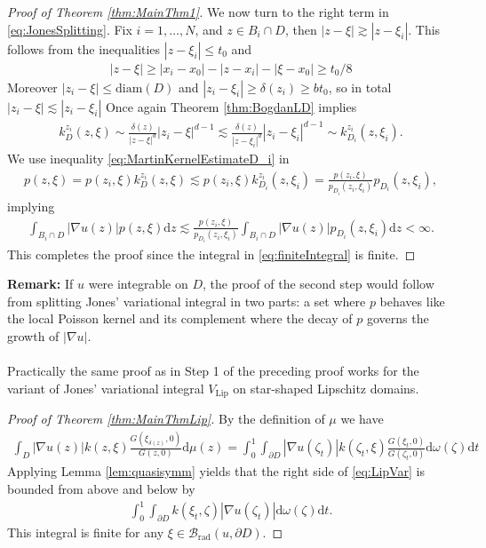 \documentclass[a4paper,12pt]{article}
\theoremstyle{definition}
\theoremstyle{definition}
\begin{document}
\begin{proof}[Proof of Theorem \ref{thm:MainThm1}]
		We now turn to the right term in \eqref{eq:JonesSplitting}. Fix $i=1,\dots,N$, and $z\in B_i\cap D$, then $|z-\xi|\gtrsim|z-\xi_i|$. This follows from the inequalities $|z-\xi_i|\leq t_0$ and 
		\begin{align}
			|z-\xi|\geq|x_i-x_0|-|z-x_i|-|\xi-x_0|\geq t_0/8
		\end{align}
		Moreover $|z_i-\xi|\leq\mathrm{diam}(D)$ and $|z_i-\xi_i|\geq\delta(z_i)\geq b t_0$, so in total $|z_i-\xi|\lesssim|z_i-\xi_i|$ Once again Theorem \ref{thm:BogdanLD} implies
		\begin{align}\label{eq:MartinKernelEstimateD_i}
			k_{D}^{z_i}(z,\xi)\sim\frac{\delta(z)}{|z-\xi|^d}|z_i-\xi|^{d-1}\lesssim \frac{\delta(z)}{|z-\xi_i|^d}|z_i-\xi_i|^{d-1}\sim k_{D_i}^{z_i}(z,\xi_i).
		\end{align}
		We use inequality \eqref{eq:MartinKernelEstimateD_i} in
		\begin{align*}
			p(z,\xi)=p(z_i,\xi) k^{z_i}_{D}(z,\xi)\lesssim p(z_i,\xi)k^{z_i}_{ D_i}(z,\xi_i) = \frac{p(z_i,\xi)}{p_{D_i}(z_i,\xi_i)} p_{D_i}(z,\xi_i),
		\end{align*}
		implying 
		\begin{align}
			\int_{B_i\cap D}|\nabla u(z)|p(z,\xi)\mathrm dz\lesssim \frac{p(z_i,\xi)}{p_{D_i}(z_i,\xi_i)}\int_{B_i\cap D}|\nabla u(z)|p_{D_i}(z,\xi_i)\mathrm dz<\infty.
		\end{align}
		This completes the proof since the integral in \eqref{eq:finiteIntegral} is finite.
	\end{proof}
	\noindent\textbf{Remark:} If $u$ were integrable on $D$, the proof of the second step would follow from splitting Jones' variational integral in two parts: a set where $p$ behaves like the local Poisson kernel and its complement where the decay of $p$ governs the growth of $|\nabla u|$.\\\\
	Practically the same proof as in Step 1 of the preceding proof works for the variant of Jones' variational integral $V_{\mathrm{Lip}}$ on star-shaped Lipschitz domains.
	\begin{proof}[Proof of Theorem \ref{thm:MainThmLip}]
		By the definition of $\mu$ we have
		\begin{align}\label{eq:LipVar}
			\int_D|\nabla u(z)|k(z,\xi)\frac{G(\xi_{\delta(z)},0)}{G(z,0)}\mathrm d\mu(z) =\int_0^1\int_{\partial D}|\nabla u(\zeta_t)|k(\zeta_t,\xi)\frac{G(\xi_t,0)}{G(\zeta_t,0)}\mathrm{d}\omega(\zeta)\mathrm{d}t
		\end{align}
		Applying Lemma \ref{lem:quasisymm} yields that the right side of \eqref{eq:LipVar} is bounded from above and below by
		\begin{align*}
			\int_0^1\int_{\partial D}k(\xi_t,\zeta)|\nabla u(\zeta_t)|\mathrm{d}\omega(\zeta)\mathrm{d}t.
		\end{align*}
		This integral is finite for any $\xi\in\mathcal B_{\mathrm{rad}}(u,\partial D)$.
	\end{proof}
\end{document}
